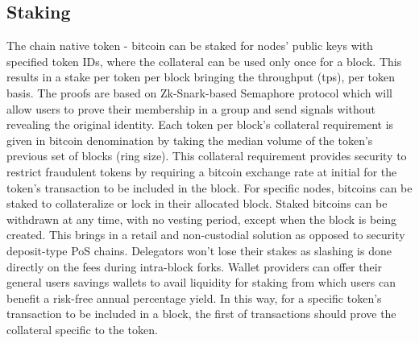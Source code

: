 \documentclass[a4paper,	10pt]{extarticle}
\begin{document}
\subsection{Staking}
The chain native token - bitcoin can be staked for nodes' public keys with specified token IDs, where the collateral can be used only once for a block. This results in a stake per token per block bringing the throughput (tps), per token basis. The proofs are based on Zk-Snark-based Semaphore protocol \cite{semaphore} which will allow users to prove their membership in a group and send signals without revealing the original identity. Each token per block's collateral requirement is given in bitcoin denomination by taking the median volume of the token's previous set of blocks (ring size). This collateral requirement provides security to restrict fraudulent tokens by requiring a bitcoin exchange rate at initial for the token's transaction to be included in the block. For specific nodes, bitcoins can be staked to collateralize or lock in their allocated block. Staked bitcoins can be withdrawn at any time, with no vesting period, except when the block is being created. This brings in a retail and non-custodial solution as opposed to security deposit-type PoS chains. Delegators won't lose their stakes as slashing is done directly on the fees during intra-block forks. Wallet providers can offer their general users savings wallets to avail liquidity for staking from which users can benefit a risk-free annual percentage yield. In this way, for a specific token's transaction to be included in a block, the first of transactions should prove the collateral specific to the token.
\end{document}

